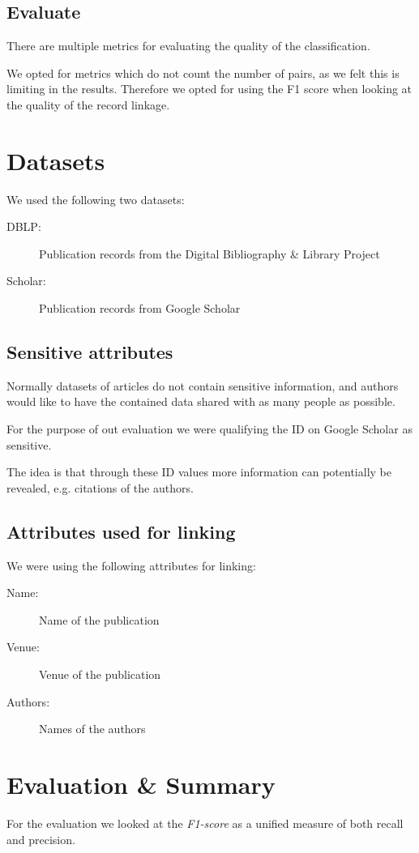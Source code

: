 \documentclass[sigconf,nonacm]{acmart}
\begin{document}
\subsection{Evaluate}

There are multiple metrics for evaluating the quality of the classification.

We opted for metrics which do not count the number of pairs, as we felt
this is limiting in the results.
Therefore we opted for using the F1 score when looking at the quality
of the record linkage.

\section{Datasets}

We used the following two datasets:
\begin{description}
\item[DBLP:] Publication records from the Digital Bibliography \& Library Project
\item[Scholar:] Publication records from Google Scholar
\end{description}

\subsection{Sensitive attributes}

Normally datasets of articles do not contain sensitive information,
and authors would like to have the contained data shared with
as many people as possible.

For the purpose of out evaluation we were qualifying the
ID on Google Scholar as sensitive.

The idea is that through these ID values more information
can potentially be revealed, e.g. citations of the authors.

\subsection{Attributes used for linking}

We were using the following attributes for linking:
\begin{description}
\item[Name:] Name of the publication
\item[Venue:] Venue of the publication
\item[Authors:] Names of the authors
\end{description}

\section{Evaluation \& Summary}

For the evaluation we looked at the \emph{F1-score} as a unified
measure of both recall and precision.



\end{document}
